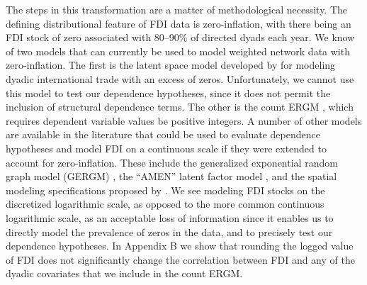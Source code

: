 \documentclass[reqno,onecolumn,letterpaper,12pt]{article}
\begin{document}
The steps in this transformation are a matter of methodological necessity.  The defining distributional feature of FDI data is zero-inflation, with there being an FDI stock of zero associated with 80--90\% of directed dyads each year. We know of two models that can currently be used to model weighted network data with zero-inflation. The first is the latent space model developed by \cite{ward2013gravity} for modeling dyadic international trade with an excess of zeros. Unfortunately, we cannot use this model to test our dependence hypotheses, since it does not permit the inclusion of structural dependence terms. The other is the count ERGM \citep{krivitsky2012exponential}, which requires dependent variable values be positive integers. A number of other models are available in the literature that could be used to evaluate dependence hypotheses and model FDI on a continuous scale if they were extended to account for zero-inflation. These include the generalized exponential random graph model (GERGM) \citep{wilson2017stochastic},  the ``AMEN'' latent factor model \citep{minhas2019inferential}, and the spatial modeling specifications proposed by \cite{neumayer2010spatial}.  We see modeling FDI stocks on the discretized logarithmic scale, as opposed to the more common continuous logarithmic scale, as an acceptable loss of information since it enables us to directly model the prevalence of zeros in the data, and to precisely test our dependence hypotheses. In Appendix B we show that rounding the logged value of FDI does not significantly change the correlation between FDI and any of the dyadic covariates that we include in the count ERGM.

\end{document}
